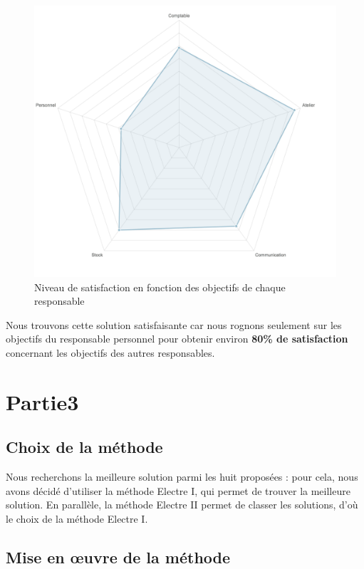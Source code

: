 \documentclass[a4paper, 11pt]{article}
\begin{document}
\begin{figure}[H]
    \begin{center}
        \includegraphics[scale=0.5]{../Partie2/Partie2.png}
        \caption{
            \label{fig} Niveau de satisfaction en fonction des objectifs de chaque responsable
        }
    \end{center}
\end{figure}
Nous trouvons cette solution satisfaisante car nous rognons seulement sur les objectifs du responsable personnel pour obtenir environ \textbf{80\% de satisfaction} concernant les objectifs des autres responsables. 

\section{Partie3}
\subsection{Choix de la méthode}
Nous recherchons la meilleure solution parmi les huit proposées : pour cela, nous avons décidé d’utiliser la méthode Electre I, qui permet de trouver la meilleure solution. En parallèle, la méthode Electre II permet de classer les solutions, d’où le choix de la méthode Electre I.
\subsection{Mise en œuvre de la méthode}
\end{document}
